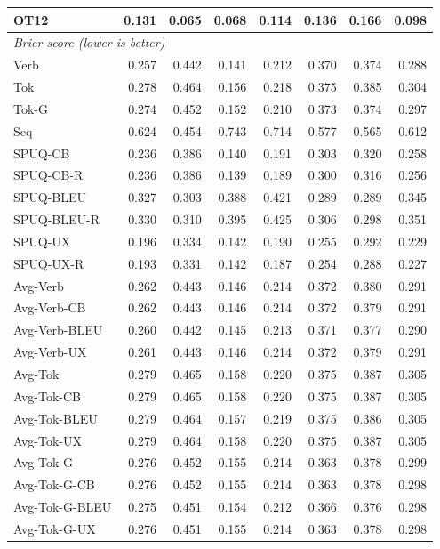 {\begin{longtable}{@{}lrrrrrrr@{}}
OT12 & 0.131 & 0.065 & 0.068 & 0.114 & 0.136 & 0.166 & 0.098 \\
\midrule
\multicolumn{8}{l}{\textit{Brier score (lower is better)}} \\
\midrule
Verb & 0.257 & 0.442 & 0.141 & 0.212 & 0.370 & 0.374 & 0.288 \\
\addlinespace
Tok & 0.278 & 0.464 & 0.156 & 0.218 & 0.375 & 0.385 & 0.304 \\
Tok-G & 0.274 & 0.452 & 0.152 & 0.210 & 0.373 & 0.374 & 0.297 \\
\addlinespace
Seq & 0.624 & 0.454 & 0.743 & 0.714 & 0.577 & 0.565 & 0.612 \\
\addlinespace
SPUQ-CB & 0.236 & 0.386 & 0.140 & 0.191 & 0.303 & 0.320 & 0.258 \\
SPUQ-CB-R & 0.236 & 0.386 & 0.139 & 0.189 & 0.300 & 0.316 & 0.256 \\
SPUQ-BLEU & 0.327 & 0.303 & 0.388 & 0.421 & 0.289 & 0.289 & 0.345 \\
SPUQ-BLEU-R & 0.330 & 0.310 & 0.395 & 0.425 & 0.306 & 0.298 & 0.351 \\
SPUQ-UX & 0.196 & 0.334 & 0.142 & 0.190 & 0.255 & 0.292 & 0.229 \\
SPUQ-UX-R & 0.193 & 0.331 & 0.142 & 0.187 & 0.254 & 0.288 & 0.227 \\
\addlinespace
Avg-Verb & 0.262 & 0.443 & 0.146 & 0.214 & 0.372 & 0.380 & 0.291 \\
Avg-Verb-CB & 0.262 & 0.443 & 0.146 & 0.214 & 0.372 & 0.379 & 0.291 \\
Avg-Verb-BLEU & 0.260 & 0.442 & 0.145 & 0.213 & 0.371 & 0.377 & 0.290 \\
Avg-Verb-UX & 0.261 & 0.443 & 0.146 & 0.214 & 0.372 & 0.379 & 0.291 \\
\addlinespace
Avg-Tok & 0.279 & 0.465 & 0.158 & 0.220 & 0.375 & 0.387 & 0.305 \\
Avg-Tok-CB & 0.279 & 0.465 & 0.158 & 0.220 & 0.375 & 0.387 & 0.305 \\
Avg-Tok-BLEU & 0.279 & 0.464 & 0.157 & 0.219 & 0.375 & 0.386 & 0.305 \\
Avg-Tok-UX & 0.279 & 0.464 & 0.158 & 0.220 & 0.375 & 0.387 & 0.305 \\
Avg-Tok-G & 0.276 & 0.452 & 0.155 & 0.214 & 0.363 & 0.378 & 0.299 \\
Avg-Tok-G-CB & 0.276 & 0.452 & 0.155 & 0.214 & 0.363 & 0.378 & 0.298 \\
Avg-Tok-G-BLEU & 0.275 & 0.451 & 0.154 & 0.212 & 0.366 & 0.376 & 0.298 \\
Avg-Tok-G-UX & 0.276 & 0.451 & 0.155 & 0.214 & 0.363 & 0.378 & 0.298 \\

\end{longtable}}
